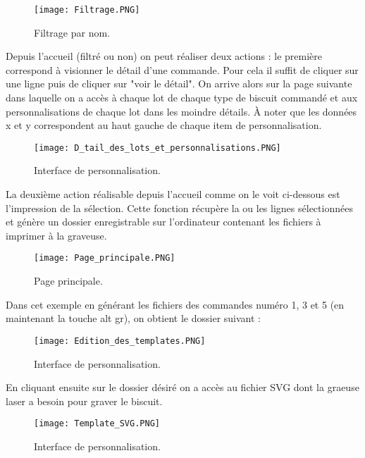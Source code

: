 \documentclass[a4paper]{article}
\begin{document}
\begin{figure}[H]
\centering
\texttt{[image: Filtrage.PNG]}
\caption{\label{fig:tp1-exo1}Filtrage par nom.}
\end{figure}

Depuis l'accueil (filtré ou non) on peut réaliser deux actions : le première correspond à visionner le détail d'une commande. Pour cela il suffit de cliquer sur une ligne puis de cliquer sur "voir le détail". On arrive alors sur la page suivante dans laquelle on a accès à chaque lot de chaque type de biscuit commandé et aux personnalisations de chaque lot dans les moindre détails. À noter que les données x et y correspondent au haut gauche de chaque item de personnalisation.

\begin{figure}[H]
\centering
\texttt{[image: D\_tail\_des\_lots\_et\_personnalisations.PNG]}
\caption{\label{fig:tp1-exo1}Interface de personnalisation.}
\end{figure}

La deuxième action réalisable depuis l'accueil comme on le voit ci-dessous est l'impression de la sélection. Cette fonction récupère la ou les lignes sélectionnées et génère un dossier enregistrable sur l'ordinateur contenant les fichiers à imprimer à la graveuse.

\begin{figure}[H]
\centering
\texttt{[image: Page\_principale.PNG]}
\caption{\label{fig:tp1-exo1}Page principale.}
\end{figure}

Dans cet exemple en générant les fichiers des commandes numéro 1, 3 et 5 (en maintenant la touche alt gr), on obtient le dossier suivant :

\begin{figure}[H]
\centering
\texttt{[image: Edition\_des\_templates.PNG]}
\caption{\label{fig:tp1-exo1}Interface de personnalisation.}
\end{figure}

En cliquant ensuite sur le dossier désiré on a accès au fichier SVG dont la graeuse laser a besoin pour graver le biscuit.

\begin{figure}[H]
\centering
\texttt{[image: Template\_SVG.PNG]}
\caption{\label{fig:tp1-exo1}Interface de personnalisation.}
\end{figure}
\end{document}
